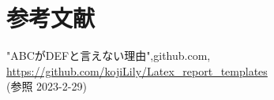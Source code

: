 \newpage
\section{参考文献}
\begin{thebibliography}{99}
  "ABCがDEFと言えない理由",github.com,\\ \url{https://github.com/kojiLily/Latex_report_templates}\\(参照 2023-2-29)
\end{thebibliography}
